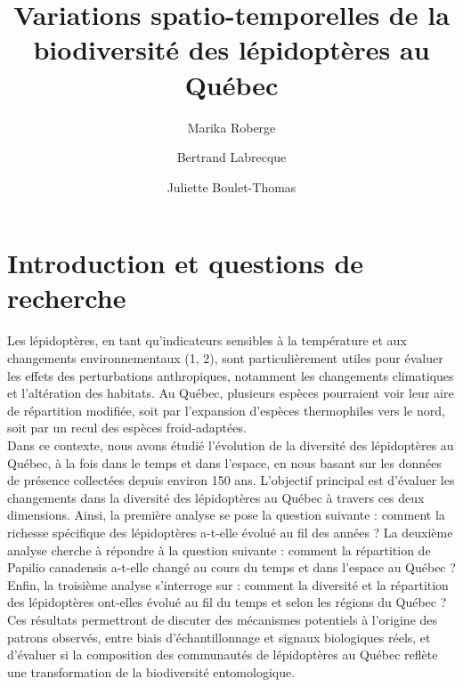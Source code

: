 \documentclass[9pt,twocolumn,twoside,]{pnas-new}
\title{Variations spatio-temporelles de la biodiversité des lépidoptères
au Québec}
\author[a]{Marika Roberge}
\author[a]{Bertrand Labrecque}
\author[a]{Juliette Boulet-Thomas}
\affil[a]{Faculté des sciences, Département de biologie, 2500
Boulevard de l'Université, Sherbrooke, Québec, J1K 2R1}
\begin{document}
\verticaladjustment{-2pt}



\maketitle
\thispagestyle{firststyle}


\acknow{}

\section{Introduction et questions de
recherche}\label{introduction-et-questions-de-recherche}

Les lépidoptères, en tant qu'indicateurs sensibles à la température et
aux changements environnementaux (1, 2), sont particulièrement utiles
pour évaluer les effets des perturbations anthropiques, notamment les
changements climatiques et l'altération des habitats. Au Québec,
plusieurs espèces pourraient voir leur aire de répartition modifiée,
soit par l'expansion d'espèces thermophiles vers le nord, soit par un
recul des espèces froid-adaptées.\\
Dans ce contexte, nous avons étudié l'évolution de la diversité des
lépidoptères au Québec, à la fois dans le temps et dans l'espace, en
nous basant sur les données de présence collectées depuis environ 150
ans. L'objectif principal est d'évaluer les changements dans la
diversité des lépidoptères au Québec à travers ces deux dimensions.
Ainsi, la première analyse se pose la question suivante : comment la
richesse spécifique des lépidoptères a-t-elle évolué au fil des années ?
La deuxième analyse cherche à répondre à la question suivante : comment
la répartition de Papilio canadensis a-t-elle changé au cours du temps
et dans l'espace au Québec ? Enfin, la troisième analyse s'interroge sur
: comment la diversité et la répartition des lépidoptères ont-elles
évolué au fil du temps et selon les régions du Québec ?\\
Ces résultats permettront de discuter des mécanismes potentiels à
l'origine des patrons observés, entre biais d'échantillonnage et signaux
biologiques réels, et d'évaluer si la composition des communautés de
lépidoptères au Québec reflète une transformation de la biodiversité
entomologique.
\end{document}
